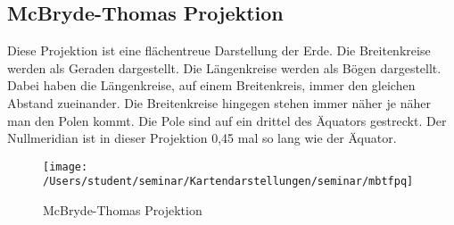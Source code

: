 \subsection{McBryde-Thomas Projektion}
\label{sec:mcbryde-thomas}
Diese Projektion ist eine flächentreue Darstellung der Erde. Die Breitenkreise werden als Geraden dargestellt. Die Längenkreise werden als Bögen dargestellt. Dabei haben die Längenkreise, auf einem Breitenkreis, immer den gleichen Abstand zueinander. Die Breitenkreise hingegen stehen immer näher je näher man den Polen kommt. Die Pole sind auf ein drittel des Äquators gestreckt. Der Nullmeridian ist in dieser Projektion 0,45 mal so lang wie der Äquator.\\

\begin{figure}[hbtp]
\centering
\texttt{[image: /Users/student/seminar/Kartendarstellungen/seminar/mbtfpq]} \caption{McBryde-Thomas Projektion}
\end{figure}
\newpage 